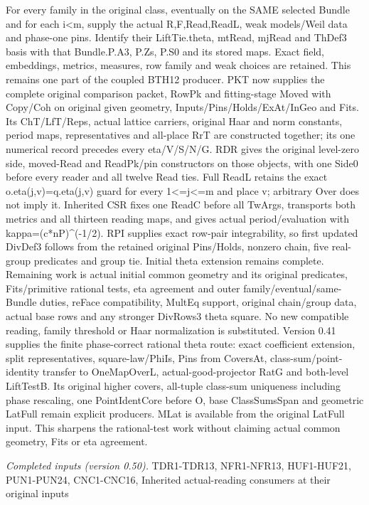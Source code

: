 \documentclass[11pt,a4paper]{article}
\numberwithin{equation}{section}
\theoremstyle{remark}\newtheorem{remark}[theorem]{Remark}
\begin{document}
For every family in the original class, eventually on the SAME selected Bundle and for each i<m, supply the actual R,F,Read,ReadL, weak models/Weil data and phase-one pins. Identify their LiftTie.theta, mtRead, mjRead and ThDef3 basis with that Bundle.P.A3, P.Zs, P.S0 and its stored maps. Exact field, embeddings, metrics, measures, row family and weak choices are retained. This remains one part of the coupled BTH12 producer. PKT now supplies the complete original comparison packet, RowPk and fitting-stage Moved with Copy/Coh on original given geometry, Inputs/Pins/Holds/ExAt/InGeo and Fits. Its ChT/LfT/Reps, actual lattice carriers, original Haar and norm constants, period maps, representatives and all-place RrT are constructed together; its one numerical record precedes every eta/V/S/N/G. RDR gives the original level-zero side, moved-Read and ReadPk/pin constructors on those objects, with one Side0 before every reader and all twelve Read ties. Full ReadL retains the exact o.eta(j,v)=q.eta(j,v) guard for every 1<=j<=m and place v; arbitrary Over does not imply it. Inherited CSR fixes one ReadC before all TwArgs, transports both metrics and all thirteen reading maps, and gives actual period/evaluation with kappa=(c*nP)\textasciicircum{}(-1/2). RPI supplies exact row-pair integrability, so first updated DivDef3 follows from the retained original Pins/Holds, nonzero chain, five real-group predicates and group tie. Initial theta extension remains complete. Remaining work is actual initial common geometry and its original predicates, Fits/primitive rational tests, eta agreement and outer family/eventual/same-Bundle duties, reFace compatibility, MultEq support, original chain/group data, actual base rows and any stronger DivRows3 theta square. No new compatible reading, family threshold or Haar normalization is substituted. Version 0.41 supplies the finite phase-correct rational theta route: exact coefficient extension, split representatives, square-law/PhiIs, Pins from CoversAt, class-sum/point-identity transfer to OneMapOverL, actual-good-projector RatG and both-level LiftTestB. Its original higher covers, all-tuple class-sum uniqueness including phase rescaling, one PointIdentCore before O, base ClassSumsSpan and geometric LatFull remain explicit producers. MLat is available from the original LatFull input. This sharpens the rational-test work without claiming actual common geometry, Fits or eta agreement.

\emph{Completed inputs (version 0.50).} TDR1-TDR13, NFR1-NFR13, HUF1-HUF21, PUN1-PUN24, CNC1-CNC16, Inherited actual-reading consumers at their original inputs
\end{document}
